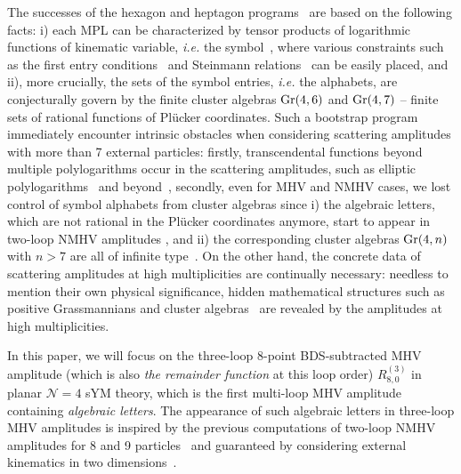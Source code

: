 \documentclass[a4paper,12pt]{article}
\begin{document}
The successes of the hexagon and heptagon programs~\cite{Dixon:2011pw,Dixon:2014xca,Dixon:2014iba,Drummond:2014ffa,Dixon:2015iva,Caron-Huot:2016owq} are based on the following facts: i) each MPL can be characterized by tensor products of logarithmic functions of kinematic variable, \emph{i.e.} the symbol~\cite{Goncharov:2010jf,Duhr:2011zq,Duhr:2012fh}, where various constraints such as the first entry conditions~\cite{Gaiotto:2011dt} and Steinmann relations~\cite{Steinmann1960a,Steinmann1960b} can be easily placed, and ii), more crucially, the sets of the symbol entries, \emph{i.e.} the alphabets, are conjecturally govern by the finite cluster algebras $\rm{Gr}(4,6)$ and $\rm{Gr}(4,7)$ -- finite sets of rational functions of Pl\"{u}cker coordinates. Such a bootstrap program immediately encounter intrinsic obstacles when considering scattering amplitudes with more than 7 external particles: firstly, transcendental functions beyond multiple polylogarithms occur in the scattering amplitudes, such as elliptic polylogarithms~\cite{Bourjaily:2017bsb,Kristensson:2021ani} and beyond~\cite{Bourjaily:2018ycu}, secondly, even for MHV and NMHV cases, we lost control of symbol alphabets from cluster algebras since i) the algebraic letters, which are not rational in the Pl\"{u}cker coordinates anymore, start to appear in two-loop NMHV amplitudes \cite{Zhang:2019vnm}, and ii) the corresponding cluster algebras ${\rm Gr}(4,n)$ with $n>7$ are all of infinite type~\cite{scott2006grassmannians}. On the other hand, the concrete data of scattering amplitudes at high multiplicities are continually necessary: needless to mention their own physical significance, hidden mathematical structures such as positive Grassmannians and cluster algebras~\cite{Arkani-Hamed:2016byb,Golden:2013xva,Drummond:2017ssj,Drummond:2018dfd,Drummond:2019cxm,Arkani-Hamed:2019rds,Henke:2019hve} are revealed by the amplitudes at high multiplicities.

In this paper, we will focus on the three-loop 8-point BDS-subtracted MHV amplitude (which is also \emph{the remainder function} at this loop order) $R_{8,0}^{(3)}$ in planar $\mathcal{N}{=}4$ sYM theory, which is the first multi-loop MHV amplitude containing \emph{algebraic letters}. The appearance of such algebraic letters in three-loop MHV amplitudes is inspired by the previous computations of two-loop NMHV amplitudes for 8 and 9 particles~\cite{Zhang:2019vnm,He:2020vob} and guaranteed by considering external kinematics in two dimensions~\cite{Caron-Huot:2013vda,He:2021fwf}.
\end{document}
